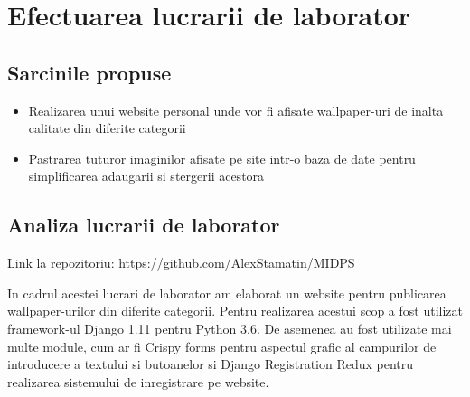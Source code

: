 \section{Efectuarea lucrarii de laborator}

\subsection{Sarcinile propuse}
\begin{itemize}
	\item Realizarea unui website personal unde vor fi afisate wallpaper-uri de inalta calitate din diferite categorii
	\item Pastrarea tuturor imaginilor afisate pe site intr-o baza de date pentru simplificarea adaugarii si stergerii acestora
\end{itemize}


\subsection{Analiza lucrarii de laborator}

Link la repozitoriu: https://github.com/AlexStamatin/MIDPS
	
	In cadrul acestei lucrari de laborator am elaborat un website pentru publicarea wallpaper-urilor din diferite categorii. Pentru realizarea acestui scop a fost utilizat framework-ul Django 1.11 pentru Python 3.6. De asemenea au fost utilizate mai multe module, cum ar fi Crispy forms pentru aspectul grafic al campurilor de introducere a textului si butoanelor si Django Registration Redux pentru realizarea sistemului de inregistrare pe website.

